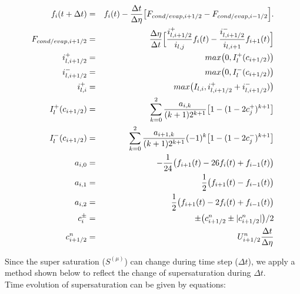 \begin{eqnarray}
f_{i}(t+\Delta t)&=&f_{i}(t)-\frac{\Delta t}{\Delta \eta}\bigl [F_{cond/evap,i+1/2}-F_{cond/evap,i-1/2}\Bigr ].\nonumber\\
F_{cond/evap,i+1/2}&=&\frac{\Delta \eta}{\Delta t}\Bigl[ \frac{i^{+}_{l,i+1/2}}{i_{l,j}}f_{i}(t)-\frac{i^{-}_{l,i+1/2}}{i_{l,i+1}}f_{i+1}(t)\Bigr ]\nonumber\\
i^{+}_{l,i+1/2}&=&max\bigl(0,I^{+}_{l}(c_{i+1/2})\bigr)\nonumber\\
i^{-}_{l,i+1/2}&=&max\bigl(0,I^{-}_{l}(c_{i+1/2})\bigr)\nonumber\\
i^{+}_{l,i}&=&max\bigl(I_{l,i},i^{+}_{l,i+1/2}+i^{-}_{l,i+1/2})\bigr)\nonumber\\
I^{+}_{l}(c_{i+1/2})&=&\sum_{k=0}^{2}\frac{a_{i,k}}{(k+1)2^{k+1}}\bigl[1-(1-2c^{+}_{j})^{k+1}\bigr]\nonumber\\
I^{-}_{l}(c_{i+1/2})&=&\sum_{k=0}^{2}\frac{a_{i+1,k}}{(k+1)2^{k+1}}(-1)^{k}\bigl[1-(1-2c^{-}_{j})^{k+1}\bigr]\nonumber\\
a_{i,0}&=&-\frac{1}{24}\bigl( f_{i+1}(t)-26f_{i}(t)+f_{i-1}(t) \bigr)\nonumber\\
a_{i,1}&=&\frac{1}{2}\bigl( f_{i+1}(t)-f_{i-1}(t) \bigr)\nonumber\\
a_{i,2}&=&\frac{1}{2}\bigl( f_{i+1}(t)-2f_{i}(t)+f_{i-1}(t) \bigr)\nonumber\\
c_{i}^{\pm}&=&\pm\bigl( c^{n}_{i+1/2}\pm | c^{n}_{i+1/2}|\bigr )/2\nonumber\\
c^{n}_{i+1/2}&=&U^{n}_{i+1/2}\frac{\Delta t}{\Delta \eta}
\end{eqnarray}

Since the super saturation ($S^{(\mu)}$) can change during time step ($\Delta t$), we apply a method shown below to reflect the change of supersaturation during $\Delta t$.\\
Time evolution of supersaturation can be given by equations:

